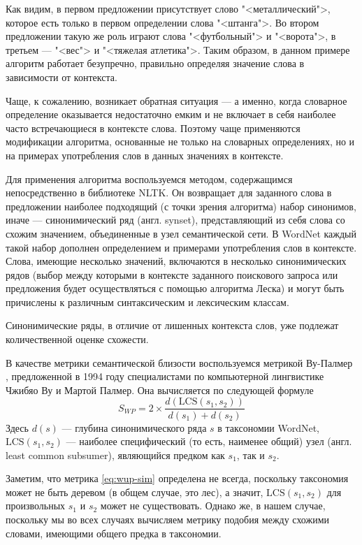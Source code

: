 Как видим, в первом предложении присутствует слово "<металлический">, которое есть только в первом определении слова "<штанга">.
Во втором предложении такую же роль играют слова "<футбольный"> и "<ворота">, в третьем --- "<вес"> и "<тяжелая атлетика">.
Таким образом, в данном примере алгоритм работает безупречно, правильно определяя значение слова в зависимости от контекста.

Чаще, к сожалению, возникает обратная ситуация --- а именно, когда словарное определение оказывается недостаточно емким и не включает
в себя наиболее часто встречающиеся в контексте слова. Поэтому чаще применяются модификации алгоритма, основанные не только на
словарных определениях, но и на примерах употребления слов в данных значениях в контексте.

Для применения алгоритма воспользуемся методом, содержащимся непосредственно в библиотеке NLTK. Он возвращает для заданного слова
в предложении наиболее подходящий (с точки зрения алгоритма) набор синонимов, иначе --- синонимический ряд (англ. synset),
представляющий из себя слова со схожим значением, объединенные в узел семантической сети. В WordNet каждый такой набор дополнен
определением и примерами употребления слов в контексте. Слова, имеющие несколько значений, включаются в несколько синонимических рядов
(выбор между которыми в контексте заданного поискового запроса или предложения будет осуществляться с помощью алгоритма Леска)
и могут быть причислены к различным синтаксическим и лексическим классам.

Синонимические ряды, в отличие от лишенных контекста слов, уже подлежат количественной оценке схожести.

В качестве метрики семантической близости воспользуемся метрикой Ву-Палмер \cite{10.3115/981732.981751}, предложенной в 1994 году
специалистами по компьютерной лингвистике Чжибяо Ву и Мартой Палмер. Она вычисляется по следующей формуле
\begin{equation}
    \label{eq:wup-sim}
    S_{WP} = 2\times\frac{d(\mathrm{LCS}(s_1, s_2))}{d(s_1) + d(s_2)}
\end{equation}
Здесь $d(s)$ --- глубина синонимического ряда $s$ в таксономии WordNet, $\mathrm{LCS}(s_1, s_2)$ --- наиболее специфический
(то есть, наименее общий) узел (англ. least common subsumer), являющийся предком как $s_1$, так и $s_2$.

Заметим, что метрика \eqref{eq:wup-sim} определена не всегда, поскольку таксономия может не быть деревом (в общем случае, это лес),
а значит, $\mathrm{LCS}(s_1, s_2)$ для произвольных $s_1$ и $s_2$ может не существовать. Однако же, в нашем случае, поскольку мы
во всех случаях вычисляем метрику подобия между схожими словами, имеющими общего предка в таксономии.

